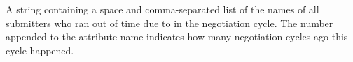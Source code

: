 \begin{description}
\item[\AdAttr{LastNegotiationCycleSubmittersOutOfTimeX}:] A string containing
  a space and comma-separated list of the names of all submitters who
  ran out of time due to 
  in the negotiation cycle.  The number  appended to the
  attribute name indicates how many negotiation cycles ago this cycle
  happened.

\end{description}

